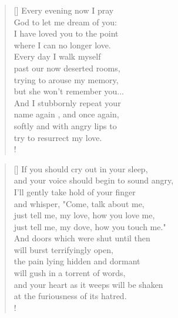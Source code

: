 \documentclass[]{article}
\begin{document}
\vspace*{0.055\textheight}
\settowidth{\versewidth}{Every evening now I pray }
\begin{verse}[\versewidth]
Every evening now I pray\\
God to let me dream of you:\\
I have loved you to the point\\
where I can no longer love.\\
Every day I walk myself\\
past our now deserted rooms,\\
trying to arouse my memory,\\
but she won't remember you...\\
And I stubbornly repeat your\\
name again , and once again,\\
softly and with angry lips to\\
try to resurrect my love.\\!
\end{verse}
\bigskip \bigskip

\settowidth{\versewidth}{If you should cry out in your sleep }
\begin{verse}[\versewidth]
If you should cry out in your sleep,\\
and your voice should begin to sound angry,\\
I'll gently take hold of your finger\\
and whisper, "Come, talk about me,\\
just tell me, my love, how you love me,\\
just tell me, my dove, how you touch me."\\
And doors which were shut until then\\
will burst terrifyingly open,\\
the pain lying hidden and dormant\\
will gush in a torrent of words,\\
and your heart as it weeps will be shaken\\
at the furiousness of its hatred.\\!
\end{verse}
\newpage
\end{document}
